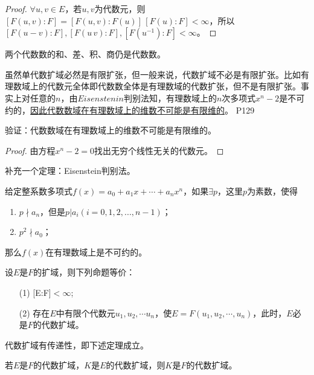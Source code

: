 \begin{proof}
	$\forall u,v\in E$，若$u,v$为代数元，则$[F(u,v):F]=[F(u,v):F(u)]\,[F(u):F]<\infty$，所以$[F(u-v):F],[F(u\,v):F],[F(u^{-1}):F]<\infty$。
\end{proof}

\begin{corollary}
	两个代数数的和、差、积、商仍是代数数。
\end{corollary}

\original
{
	虽然单代数扩域必然是有限扩张，但一般来说，代数扩域不必是有限扩张。比如有理数域上的代数元全体即代数数全体是有理数域的代数扩张，但不是有限扩张。事实上对任意的$n$，由$Eisenstenin$判别法知，有理数域上的$n$次多项式$x^{n}-2$是不可约的，\uline{因此代数数域在有理数域上的维数不可能是有限维的}。
}
{P129}

\begin{proposition}
	验证：代数数域在有理数域上的维数不可能是有限维的。
\end{proposition}

\begin{proof}
	由方程$x^{n}-2=0$找出无穷个线性无关的代数元。
\end{proof}

\begin{remark}
	补充一个定理：Eisenstein判别法。
	\par
	给定整系数多项式$f(x)=a_{0}+a_{1}x+\cdots+a_{n}x^{n}$，如果$\exists p$，这里$p$为素数，使得
	\begin{enumerate}
		\item $p\nmid a_{n}$，但是$p\big| a_{i}(i=0,1,2,...,n-1)$；
		\item $p^{2}\nmid a_{0}$；
	\end{enumerate}
	那么$f(x)$在有理数域上是不可约的。
\end{remark}



\begin{theorem}\label{YMSthe040202}
	设$E$是$F$的扩域，则下列命题等价：
	\begin{enumerate}
		\item[(1)] [E:F]$<\infty$;
		\item[(2)] 存在$E$中有限个代数元$u_{1},u_{2},\cdots u_{n}$，使$E=F(u_{1},u_{2},\cdots,u_{n})$，此时，$E$必是$F$的代数扩域。
	\end{enumerate}
\end{theorem}


代数扩域有传递性，即下述定理成立。
\begin{theorem}\label{YMSthe040203}
	若$E$是$F$的代数扩域，$K$是$E$的代数扩域，则$K$是$F$的代数扩域。
\end{theorem}

